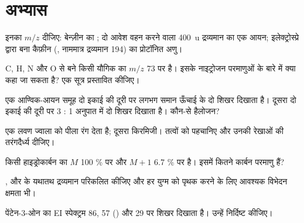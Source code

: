 \section{अभ्यास}

\begin{exercise}[$\star$]\label{exo:b2:mass-spec-atomic:1}
इनका $m/z$ दीजिए: बेन्ज़ीन  का ; दो आवेश वहन करने वाला \qty{400}{u} द्रव्यमान का
एक आयन; इलेक्ट्रोस्प्रे द्वारा बना कैफ़ीन (, नाममात्र द्रव्यमान 194) का प्रोटॉनित अणु।
\end{exercise}

\begin{exercise}[$\star$]\label{exo:b2:mass-spec-atomic:2}
C, H, N और O से बने किसी यौगिक का  $m/z$ 73 पर है। इसके नाइट्रोजन परमाणुओं के बारे में क्या कहा जा सकता है?
एक सूत्र प्रस्तावित कीजिए।
\end{exercise}

\begin{exercise}[$\star$]\label{exo:b2:mass-spec-atomic:3}
एक आण्विक-आयन समूह दो इकाई की दूरी पर लगभग समान ऊँचाई के दो शिखर दिखाता है। दूसरा दो इकाई की दूरी पर
3 : 1 अनुपात में दो शिखर दिखाता है। कौन-से हैलोजन?
\end{exercise}

\begin{exercise}[$\star$]\label{exo:b2:mass-spec-atomic:4}
एक लवण ज्वाला को पीला रंग देता है; दूसरा किरमिजी। तत्वों को पहचानिए और उनकी रेखाओं की तरंगदैर्ध्य
दीजिए।
\end{exercise}

\begin{exercise}[$\star\star$]\label{exo:b2:mass-spec-atomic:5}
किसी हाइड्रोकार्बन का $M$ 100 \% पर और $M+1$ 6.7 \% पर है। इसमें कितने कार्बन परमाणु हैं?
\end{exercise}

\begin{exercise}[$\star\star$]\label{exo:b2:mass-spec-atomic:6}
,  और  के यथातथ द्रव्यमान परिकलित कीजिए और हर युग्म को पृथक करने के लिए आवश्यक
विभेदन क्षमता भी।
\end{exercise}

\begin{exercise}[$\star\star$]\label{exo:b2:mass-spec-atomic:7}
पेंटेन-3-ओन का EI स्पेक्ट्रम 86, 57 () और 29 पर शिखर दिखाता है। उन्हें निर्दिष्ट कीजिए।
\end{exercise}

